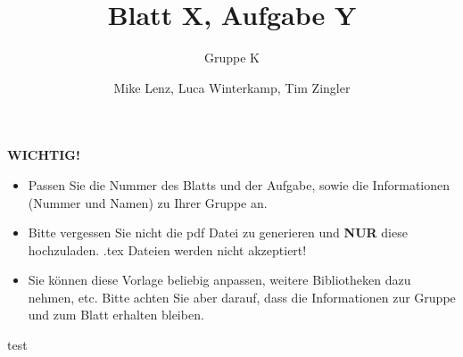 \documentclass[a4paper]{scrartcl}
\title{Blatt X, Aufgabe Y}
\subtitle{Gruppe K}
\author{Mike Lenz, Luca Winterkamp, Tim Zingler}
\date{}
\begin{document}
\maketitle

\begin{framed}
\textbf{WICHTIG!}
\begin{itemize}
\item Passen Sie die Nummer des Blatts und der Aufgabe, sowie die Informationen (Nummer und Namen) zu Ihrer Gruppe an.
 \item Bitte vergessen Sie nicht die pdf Datei zu generieren und \textbf{NUR} diese hochzuladen. .tex Dateien werden nicht akzeptiert!
 \item Sie können diese Vorlage beliebig anpassen, weitere Bibliotheken dazu nehmen, etc. Bitte achten Sie aber darauf, dass die Informationen zur Gruppe und zum Blatt erhalten bleiben.
\end{itemize}
\end{framed}
\pagebreak
test
\end{document}
